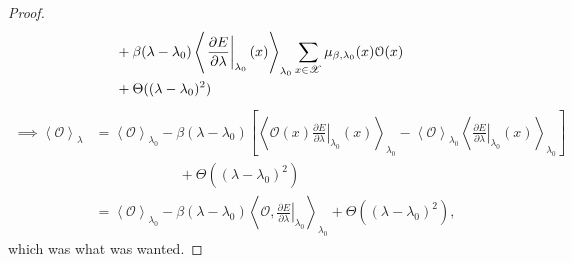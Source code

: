 \documentclass[letterpaper,english,10pt]{article}
\begin{document}
\begin{proof}
\begin{align}
 &+ \beta (\lambda - \lambda_0) \left\langle \left. \frac{\partial E}{\partial \lambda} \right|_{\lambda_0}(x) \right\rangle_{\lambda_0} \sum_{x \in \mathscr{X}} \mu_{\beta,\lambda_0}(x) \mathcal{O}(x) \nonumber \\
 &+ \Theta((\lambda - \lambda_0)^2)
\end{align}
\begin{align}
\implies \left\langle \mathcal{O} \right\rangle_{\lambda} &= \left\langle \mathcal{O} \right\rangle_{\lambda_0} - \beta (\lambda - \lambda_0) \left[ \left\langle \mathcal{O}(x) \left. \frac{\partial E}{\partial \lambda} \right|_{\lambda_0}(x) \right\rangle_{\lambda_0} - \left\langle \mathcal{O} \right\rangle_{\lambda_0} \left\langle \left. \frac{\partial E}{\partial \lambda} \right|_{\lambda_0}(x) \right\rangle_{\lambda_0} \right] \nonumber \\
	& \qquad \qquad \qquad + \Theta((\lambda - \lambda_0)^2) \nonumber \\
	&= \left\langle \mathcal{O} \right\rangle_{\lambda_0} - \beta (\lambda - \lambda_0) \left\langle \mathcal{O}, \left. \frac{\partial E}{\partial \lambda} \right|_{\lambda_0} \right\rangle_{\lambda_0} + \Theta((\lambda - \lambda_0)^2),
\end{align}
which was what was wanted.
\end{proof}
\end{document}
